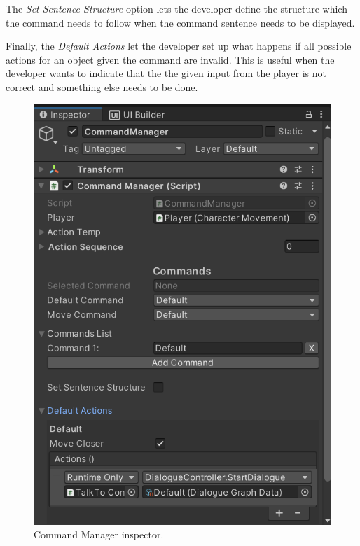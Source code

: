 The \textit{Set Sentence Structure} option lets the developer define the structure which the command needs to follow when the command sentence needs to be displayed.

Finally, the \textit{Default Actions} let the developer set up what happens if all possible actions for an object given the command are invalid. This is useful when the developer wants to indicate that the the given input from the player is not correct and something else needs to be done. 

\begin{figure}[H]
\centering
\includegraphics[width=.6\linewidth]{img/User doc/command_manager.png}
\caption{Command Manager inspector.}
\label{fig:Manual-CM}
\end{figure}

